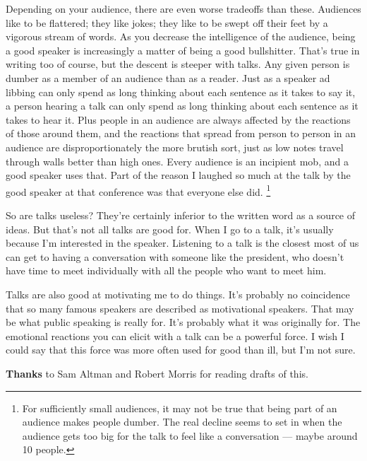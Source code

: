 Depending on your audience, there are even worse tradeoffs than these.
Audiences like to be flattered; they like jokes; they like to be swept
off their feet by a vigorous stream of words. As you decrease the
intelligence of the audience, being a good speaker is increasingly a
matter of being a good bullshitter. That's true in writing too of
course, but the descent is steeper with talks. Any given person is
dumber as a member of an audience than as a reader. Just as a speaker ad
libbing can only spend as long thinking about each sentence as it takes
to say it, a person hearing a talk can only spend as long thinking about
each sentence as it takes to hear it. Plus people in an audience are
always affected by the reactions of those around them, and the reactions
that spread from person to person in an audience are disproportionately
the more brutish sort, just as low notes travel through walls better
than high ones. Every audience is an incipient mob, and a good speaker
uses that. Part of the reason I laughed so much at the talk by the good
speaker at that conference was that everyone else did.
\footnote{For sufficiently small audiences, it may not be true that being
part of an audience makes people dumber. The real decline seems to set
in when the audience gets too big for the talk to feel like a
conversation --- maybe around 10 people.}

So are talks useless? They're certainly inferior to the written word as
a source of ideas. But that's not all talks are good for. When I go to a
talk, it's usually because I'm interested in the speaker. Listening to a
talk is the closest most of us can get to having a conversation with
someone like the president, who doesn't have time to meet individually
with all the people who want to meet him.

Talks are also good at motivating me to do things. It's probably no
coincidence that so many famous speakers are described as motivational
speakers. That may be what public speaking is really for. It's probably
what it was originally for. The emotional reactions you can elicit with
a talk can be a powerful force. I wish I could say that this force was
more often used for good than ill, but I'm not sure.


\textbf{Thanks} to Sam Altman and Robert Morris for reading drafts of
this.